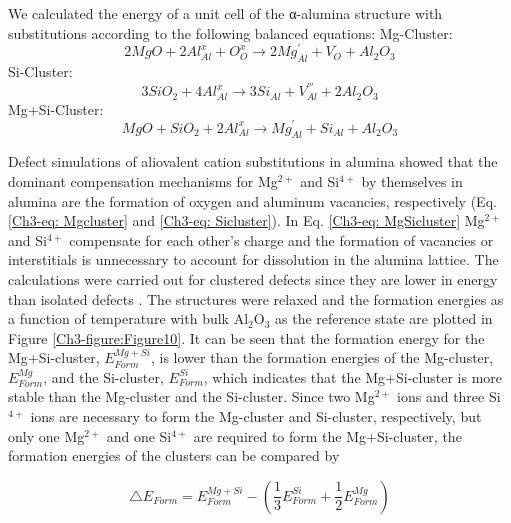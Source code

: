 We calculated the energy of a unit cell of the α-alumina structure with substitutions according to the following balanced equations:\newline
\newline
\noindent Mg-Cluster: 
\begin{equation}
\label{Ch3-eq: Mgcluster}
2MgO + 2Al_{Al}^{x} + O_{O}^{x} \longrightarrow 2Mg_{Al}^{'} + V_{O}^{^{..}} + Al_{2}O_{3}
\end{equation}
\newline
\noindent Si-Cluster:
\begin{equation}
\label{Ch3-eq: Sicluster}
3SiO_{2} + 4Al_{Al}^{x} \longrightarrow 3Si_{Al}^{^{.}} + V_{Al}^{'''} + 2Al_{2}O_{3}
\end{equation}
\newline
\noindent Mg+Si-Cluster:
\begin{equation}
\label{Ch3-eq: MgSicluster}
MgO + SiO_{2} + 2Al_{Al}^{x} \longrightarrow Mg_{Al}^{'} + Si_{Al}^{^{.}} + Al_{2}O_{3}
\end{equation}


\noindent Defect simulations of aliovalent cation substitutions in alumina \cite{Atkinson2003} showed that the dominant compensation mechanisms for Mg$^{2+}$ and Si$^{4+}$ by themselves in alumina are the formation of oxygen and aluminum vacancies, respectively (Eq.\ref{Ch3-eq: Mgcluster} and \ref{Ch3-eq: Sicluster}). In Eq. \ref{Ch3-eq: MgSicluster} Mg$^{2+}$ and Si$^{4+}$ compensate for each other's charge and the formation of vacancies or interstitials is unnecessary to account for dissolution in the alumina lattice. The calculations were carried out for clustered defects since they are lower in energy than isolated defects \cite{Atkinson2003}. The structures were relaxed and the formation energies as a function of temperature with bulk Al$_{2}$O$_{3}$ as the reference state are plotted in Figure \ref{Ch3-figure:Figure10}. It can be seen that the formation energy for the Mg+Si-cluster, $E_{Form}^{Mg+Si}$, is lower than the formation energies of the Mg-cluster, $E_{Form}^{Mg}$, and the Si-cluster, $E_{Form}^{Si}$, which indicates that the Mg+Si-cluster is more stable than the Mg-cluster and the Si-cluster. Since two Mg$^{2+}$ ions and three Si$^{4+}$ ions are necessary to form the Mg-cluster and Si-cluster, respectively, but only one Mg$^{2+}$ and one Si$^{4+}$ are required to form the Mg+Si-cluster, the formation energies of the clusters can be compared by 

\begin{equation}
\label{Ch3-eq: eform}
\bigtriangleup E_{Form}=E_{Form}^{Mg+Si} - \left( \frac{1}{3} E_{Form}^{Si} + \frac{1}{2}E_{Form}^{Mg} \right)
\end{equation}

